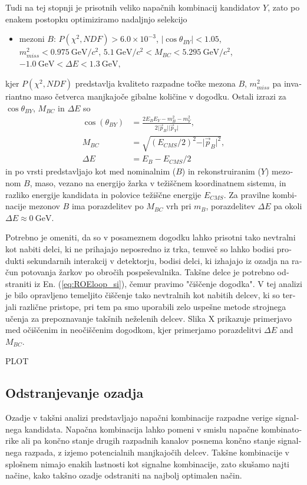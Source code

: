 \documentclass[headings=standardclasses,headings=big,oneside,a4paper,openany,12pt]{scrbook}
\newcommand {\e}[1]{\mathrm{~#1}}
\newcommand {\E}[1]{\times 10^{#1}}
\newcommand {\vars}{$\Delta E$ and $M_{BC}$}
\begin{document}
\begin{otherlanguage}{slovene}
Tudi na tej stopnji je prisotnih veliko napačnih kombinacij kandidatov $Y$, zato po enakem postopku optimiziramo nadaljnjo selekcijo
\begin{itemize}
\item mezoni $B$: $P(\chi^2,NDF) > 6.0\E{-3}$, $\vert \cos \theta_{BY} \vert < 1.05$, $m_{miss}^2 < 0.975\e{GeV}/c^2$, $5.1\e{GeV}/c^2 < M_{BC} < 5.295\e{GeV}/c^2$, $-1.0\e{GeV} < \Delta E < 1.3\e{GeV},$
\end{itemize}
kjer $P(\chi^2,NDF)$ predstavlja kvaliteto razpadne točke mezona $B$, $m_{miss}^2$ pa invariantno maso četverca manjkajoče gibalne količine v dogodku. Ostali izrazi za $\cos \theta_{BY}$, $M_{BC}$ in $\Delta E$ so
\begin{align}
\cos \left(\theta_{BY}\right) &= \frac{2E_BE_Y - m_B^2 - m_Y^2}{2\vert \vec{p}_B \vert \vert \vec{p}_Y\vert},\\
M_{BC} &= \sqrt{\left(E_{CMS}/2\right)^2 - \vert \vec{p}_B \vert^2},\\
\Delta E &= E_B - E_{CMS}/2
\end{align}
in po vrsti predstavljajo kot med nominalnim ($B$) in rekonstruiranim ($Y$) mezonom $B$, maso, vezano na energijo žarka v težiščnem koordinatnem sistemu, in razliko energije kandidata in polovice težiščne energije $E_{CMS}$. Za pravilne kombinacije mezonov $B$ ima porazdelitev po $M_{BC}$ vrh pri $m_B$, porazdelitev $\Delta E$ pa okoli $\Delta E \approx 0\e{GeV}.$

Potrebno je omeniti, da so v posameznem dogodku lahko prisotni tako nevtralni kot nabiti delci, ki ne prihajajo neposredno iz trka, temveč so lahko bodisi produkti sekundarnih interakcij v detektorju, bodisi delci, ki izhajajo iz ozadja na račun potovanja žarkov po obročih pospeševalnika. Takšne delce je potrebno odstraniti iz En. (\ref{eq:ROEloop_si}), čemur pravimo "čiščenje dogodka". V tej analizi je bilo opravljeno temeljito čiščenje tako nevtralnih kot nabitih delcev, ki so terjali različne pristope, pri tem pa smo uporabili zelo uspešne metode strojnega učenja za prepoznavanje takšnih neželenih delcev. Slika X prikazuje primerjavo med očiščenim in neočiščenim dogodkom, kjer primerjamo porazdelitvi \vars.

PLOT

\subsection{Odstranjevanje ozadja}

Ozadje v takšni analizi predstavljajo napačni kombinacije razpadne verige signalnega kandidata. Napačna kombinacija lahko pomeni v smislu napačne kombinatorike ali pa končno stanje drugih razpadnih kanalov posnema končno stanje signalnega razpada, z izjemo potencialnih manjkajočih delcev. Takšne kombinacije v splošnem nimajo enakih lastnosti kot signalne kombinacije, zato skušamo najti načine, kako takšno ozadje odstraniti na najbolj optimalen način.


\end{otherlanguage}
\end{document}
